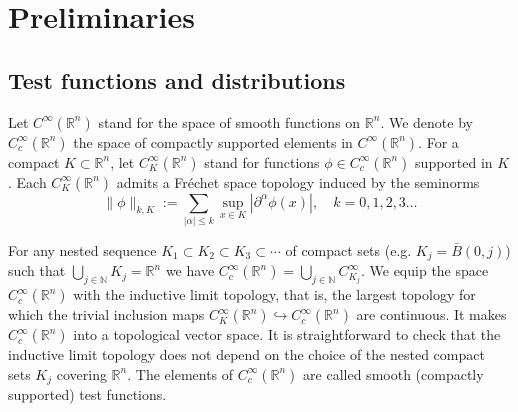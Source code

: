 \documentclass[10pt,a4paper]{article}
\theoremstyle{plain}
\theoremstyle{definition}
\theoremstyle{remark}
\numberwithin{equation}{section}
\newcommand{\R}{\mathbb{R}}
\newcommand{\N}{\mathbb{N}}
\begin{document}
\section{Preliminaries}\label{preliminaries-sec}





 

\subsection{Test functions and distributions}\label{subsection_test-functions}


Let $C^\infty(\R^n)$ stand for the space of smooth functions on $\R^n$. 
We denote by $C^\infty_c(\R^n)$ the space of compactly supported elements in $C^\infty(\R^n)$. 
For a compact $K \subset \R^n$,  let $C^\infty_K (\R^n)$ stand for functions $\phi \in C^\infty_c (\R^n)$ supported in $K$. 
Each $C_{K}^\infty( \R^n)$ admits a Fr\'echet space topology  induced by the seminorms 
\[
\| \phi \|_{k,K} := \sum_{|\alpha| \leq k} \sup_{x\in K}   | \partial^\alpha \phi(x) |, \quad k =0,1,2,3\dots
\]

For any nested sequence $K_1 \subset K_2 \subset K_3 \subset \cdots$ of compact sets (e.g. $K_j = \bar{B}(0,j)$)  such that $\bigcup_{j\in \N} K_j = \R^n$ we have $C_c^\infty ( \R^n) = \bigcup_{j \in \N} C_{K_j}^\infty$. 
We equip the space $C_c^\infty ( \R^n ) $ 
with the inductive limit topology, that is, the largest topology for which the trivial inclusion maps $ C_K^\infty  ( \R^n ) \hookrightarrow  C_c^\infty ( \R^n ) $ are continuous. 
It makes $C_c^\infty ( \R^n ) $ into a topological vector space. 
It is straightforward to check that the inductive limit topology does not depend on the choice of the nested compact sets $K_j$ covering $\R^n$. The elements of $C_c^\infty ( \R^n ) $ are called smooth (compactly supported) test functions. 
\end{document}
